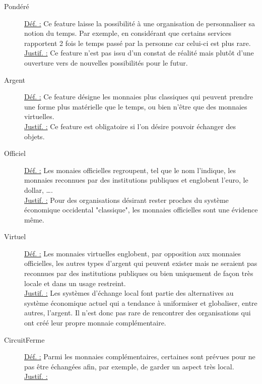 \begin{description}
\item [Pondéré]
\underline{Déf. :}  Ce feature laisse la possibilité à une organisation de personnaliser sa notion du temps.  Par exemple,  en considérant que certains services rapportent 2 fois le temps passé par la personne car celui-ci est plus rare.  
\\ \underline{Justif. :}  Ce feature n'est pas issu d'un constat de réalité mais plutôt d'une ouverture vers de nouvelles possibilités pour le futur.
\newline

\item [Argent]
\underline{Déf. :}  Ce feature désigne les monnaies plus classiques qui peuvent prendre une forme plus matérielle que le temps,  ou bien n'être que des monnaies virtuelles.
\\ \underline{Justif. :}  Ce feature est obligatoire si l'on désire pouvoir échanger des objets.  
\newline

\item [Officiel]
\underline{Déf. :}  Les monaies officielles regroupent,  tel que le nom l'indique,  les monnaies reconnues par des institutions publiques et englobent l'euro,  le dollar,  \dots.  
\\ \underline{Justif. :}  Pour des organisations désirant rester proches du système économique occidental "classique",  les monnaies officielles sont une évidence même.
\newline

\item [Virtuel]
\underline{Déf. :}  Les monnaies virtuelles englobent,  par opposition aux monnaies officielles,  les autres types d'argent qui peuvent exister mais ne seraient pas reconnues par des institutions publiques ou bien uniquement de façon très locale et dans un usage restreint.
\\ \underline{Justif. :}  Les systèmes d'échange local font partie des alternatives au système économique actuel qui a tendance à uniformiser et globaliser,  entre autres,  l'argent.  Il n'est donc pas rare de rencontrer des organisations qui ont créé leur propre monnaie complémentaire.  
\newline

\item [CircuitFerme]
\underline{Déf. :}  Parmi les monnaies complémentaires,  certaines sont prévues pour ne pas être échangées afin,  par exemple,  de garder un aspect très local.  
\\ \underline{Justif. :}  
\newline


\end{description}

